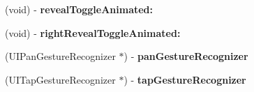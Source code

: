\begin{DoxyCompactItemize}
(void) -\/ {\bfseries reveal\+Toggle\+Animated\+:}
\item 
\mbox{\label{interface_s_w_reveal_view_controller_a53233661fa4855a8012ace24f3aa85ba}} 
(void) -\/ {\bfseries right\+Reveal\+Toggle\+Animated\+:}
\item 
\mbox{\label{interface_s_w_reveal_view_controller_ae2b988949fa1bd3a4d16f7c17c2424a1}} 
(U\+I\+Pan\+Gesture\+Recognizer $\ast$) -\/ {\bfseries pan\+Gesture\+Recognizer}
\item 
\mbox{\label{interface_s_w_reveal_view_controller_ac7145135d518d065d56326026f5c4f36}} 
(U\+I\+Tap\+Gesture\+Recognizer $\ast$) -\/ {\bfseries tap\+Gesture\+Recognizer}
\end{DoxyCompactItemize}
